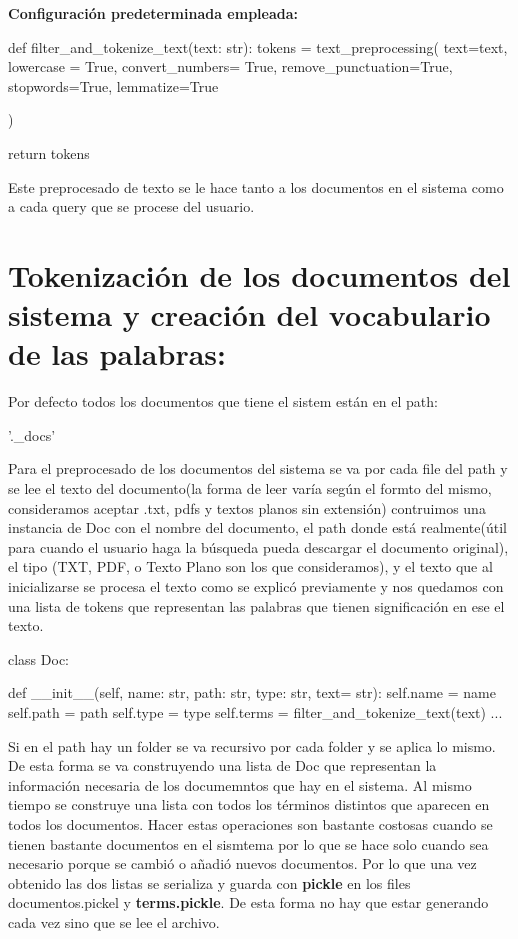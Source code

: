 \documentclass{llncs}
\begin{document}
\noindent
\textbf{Configuración predeterminada empleada:}
\begin{python}
def filter_and_tokenize_text(text: str):
    tokens = text_preprocessing(
                text=text,
                lowercase = True,
                convert_numbers= True,
                remove_punctuation=True,
                stopwords=True,
                lemmatize=True

            )

    return tokens
\end{python}

\noindent
Este preprocesado de texto se le hace tanto a los documentos en el sistema como
a cada query que se procese del usuario.

\section{Tokenización de los documentos del sistema y creación del vocabulario de las palabras:}
Por defecto todos los documentos que tiene el sistem están en el path:
\begin{python}
'.\system_docs'
\end{python}

Para el preprocesado de los documentos del sistema se va por cada file del path y
se lee el texto del documento(la forma de leer varía según el formto del mismo, consideramos
aceptar .txt, pdfs y textos planos sin extensión) contruimos una instancia de Doc con el nombre 
del documento, el path donde está realmente(útil para cuando el usuario haga la búsqueda
pueda descargar el documento original), el tipo (TXT, PDF, o Texto Plano son los que consideramos),
y el texto que al inicializarse se procesa el texto como se explicó  previamente y nos quedamos con una lista 
de tokens que representan las palabras que tienen significación en ese el texto.
\begin{python}
class Doc:

    def __init__(self, name: str, path: str, type: str, text= str):
        self.name = name
        self.path = path
        self.type = type
        self.terms = filter_and_tokenize_text(text)
    ...
\end{python}

Si en el path hay un folder se va recursivo por cada folder y se aplica lo mismo. De esta forma se va
construyendo una lista de Doc que representan la información necesaria de los documemntos que hay en el 
sistema. Al mismo tiempo se construye una lista con todos los términos distintos que aparecen en todos 
los documentos. Hacer estas operaciones son bastante costosas cuando se tienen bastante documentos en 
el sismtema por lo que se hace solo cuando sea necesario porque se cambió o añadió nuevos documentos.
Por lo que una vez obtenido las dos listas se serializa y guarda con \textbf{pickle} en los files 
{documentos.pickel} y \textbf{terms.pickle}. De esta forma no hay que estar generando cada vez sino que
se lee el archivo.
\end{document}
